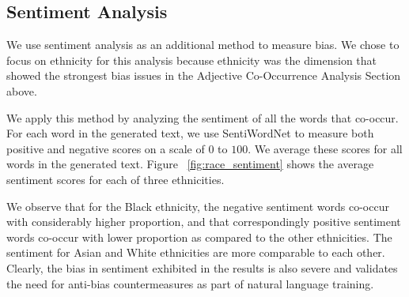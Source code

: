 \documentclass[11pt]{article}
\begin{document}
\subsection{Sentiment Analysis}

We use sentiment analysis as an additional method to measure bias.  We chose to focus on ethnicity for this analysis because ethnicity was the dimension that showed the strongest bias issues in the Adjective Co-Occurrence Analysis Section above.  

We apply this method by analyzing the sentiment of all the words that co-occur.
For each word in the generated text, we use SentiWordNet \cite{nltk-sentiwordnet}  to measure both positive and negative scores on a scale of $0$ to $100$. We average these scores for all words in the generated text.
Figure ~\ref{fig:race_sentiment} %
shows the average sentiment scores for each of three ethnicities. 

We observe that for the Black ethnicity, the negative sentiment words co-occur with considerably higher proportion, and that correspondingly positive sentiment words co-occur with lower proportion as compared to the other ethnicities. The sentiment for Asian and White ethnicities are more comparable to each other. Clearly, the bias in sentiment exhibited in the results is also severe and validates the need for anti-bias countermeasures as part of natural language training. 



\end{document}
